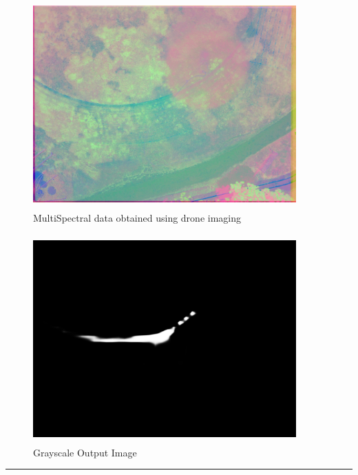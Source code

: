 \vspace{0.5cm}
\begin{figure}[h]
  \centering
  \includegraphics[width=0.9\textwidth,height=8cm]{sections/LBP/inp2.jpg}
  \caption{MultiSpectral data obtained using drone imaging}
  \label{fig:figure_label}
\end{figure}
\vspace{2cm}

\begin{figure}[h]
  \centering
  \includegraphics[width=0.9\textwidth,height=8cm]{sections/LBP/inp2.png}
  \caption{Grayscale Output Image}
  \label{fig:figure_label}
\end{figure}
\vspace{2cm}




\vspace{0.5cm}
{\color{gray}\hrule}
\vspace{0.5cm}


